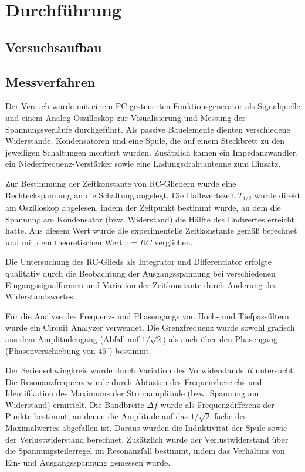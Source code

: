 \chapter{Durchführung} \label{ch:Durchfuehrung}

\section{Versuchsaufbau} \label{sec:aufbau}

\section{Messverfahren} \label{sec:Messverfahren}
Der Versuch wurde mit einem PC-gesteuerten Funktionsgenerator als Signalquelle und einem Analog-Oszilloskop zur Visualisierung und Messung der Spannungsverläufe durchgeführt. Als passive Bauelemente dienten verschiedene Widerstände, Kondensatoren und eine Spule, die auf einem Steckbrett zu den jeweiligen Schaltungen montiert wurden. Zusätzlich kamen ein Impedanzwandler, ein Niederfrequenz-Verstärker sowie eine Ladungsdrahtantenne zum Einsatz.

Zur Bestimmung der Zeitkonstante von RC-Gliedern wurde eine Rechteckspannung an die Schaltung angelegt. Die Halbwertszeit $T_{1/2}$ wurde direkt am Oszilloskop abgelesen, indem der Zeitpunkt bestimmt wurde, an dem die Spannung am Kondensator (bzw. Widerstand) die Hälfte des Endwertes erreicht hatte. Aus diesem Wert wurde die experimentelle Zeitkonstante gemäß  berechnet und mit dem theoretischen Wert $\tau = RC$ verglichen.

Die Untersuchung des RC-Glieds als Integrator und Differentiator erfolgte qualitativ durch die Beobachtung der Ausgangsspannung bei verschiedenen Eingangssignalformen und Variation der Zeitkonstante durch Änderung des Widerstandswertes.

Für die Analyse des Frequenz- und Phasengangs von Hoch- und Tiefpassfiltern wurde ein Circuit Analyzer verwendet. Die Grenzfrequenz wurde sowohl grafisch aus dem Amplitudengang (Abfall auf $1/\sqrt{2}$) als auch über den Phasengang (Phasenverschiebung von $45^\circ$) bestimmt.

Der Serienschwingkreis wurde durch Variation des Vorwiderstands $R$ untersucht. Die Resonanzfrequenz wurde durch Abtasten des Frequenzbereichs und Identifikation des Maximums der Stromamplitude (bzw. Spannung am Widerstand) ermittelt. Die Bandbreite $\Delta f$ wurde als Frequenzdifferenz der Punkte bestimmt, an denen die Amplitude auf das $1/\sqrt{2}$-fache des Maximalwertes abgefallen ist. Daraus wurden die Induktivität der Spule sowie der Verlustwiderstand berechnet. Zusätzlich wurde der Verlustwiderstand über die Spannungsteilerregel im Resonanzfall bestimmt, indem das Verhältnis von Ein- und Ausgangsspannung gemessen wurde.

